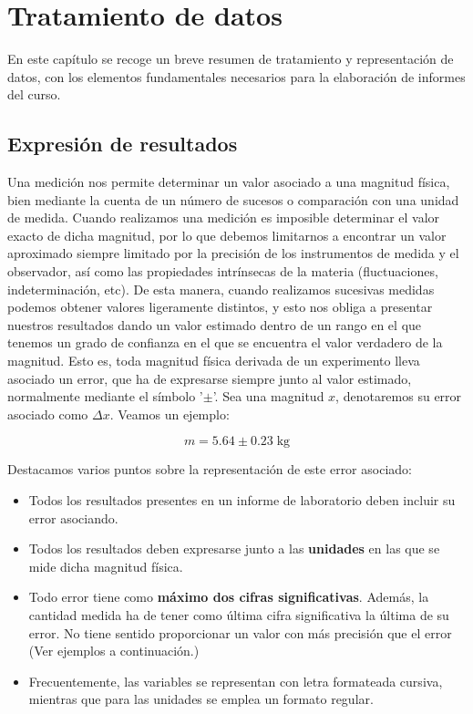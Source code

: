 \documentclass{book}
\begin{document}
\setcounter{chapter}{1}

\chapter*{Tratamiento de datos}

En este capítulo se recoge un breve resumen de tratamiento y representación de datos,
con los elementos fundamentales necesarios para la elaboración de informes del curso.

\section{Expresión de resultados}

Una medición nos permite determinar un valor asociado a una magnitud física, bien mediante
la cuenta de un número de sucesos o comparación con una unidad de medida. Cuando realizamos
una medición es imposible determinar el valor exacto de dicha magnitud, por lo que debemos
limitarnos a encontrar un valor aproximado siempre limitado por la precisión de los instrumentos
de medida y el observador, así como las propiedades intrínsecas de la materia (fluctuaciones,
indeterminación, etc). De esta manera, cuando realizamos sucesivas medidas podemos obtener valores
ligeramente distintos, y esto nos obliga a presentar nuestros resultados dando un valor estimado dentro
de un rango en el que tenemos un grado de confianza en el que se encuentra el valor verdadero de
la magnitud. Esto es, toda magnitud física derivada de un experimento lleva asociado un error, 
que ha de expresarse siempre junto al valor estimado, normalmente mediante el símbolo '$\pm$'.
Sea una magnitud $x$, denotaremos su error asociado como $\Delta x$. Veamos un ejemplo:


\begin{equation}
    m = 5.64 \pm 0.23 \; \mathrm{kg}
\end{equation}

Destacamos varios puntos sobre la representación de este error asociado:

\begin{itemize}
  \item Todos los resultados presentes en un informe de laboratorio deben incluir su error 
  asociando.
  \item Todos los resultados deben expresarse junto a las \textbf{unidades} en las que se mide dicha 
  magnitud física.
  \item Todo error tiene como \textbf{máximo dos cifras significativas}. Además, la cantidad medida
  ha de tener como última cifra significativa la última de su error. No tiene sentido proporcionar
  un valor con más precisión que el error (Ver ejemplos a continuación.)
  \item Frecuentemente, las variables se representan con letra formateada cursiva, mientras 
  que para las unidades se emplea un formato regular.
\end{itemize}
\end{document}
